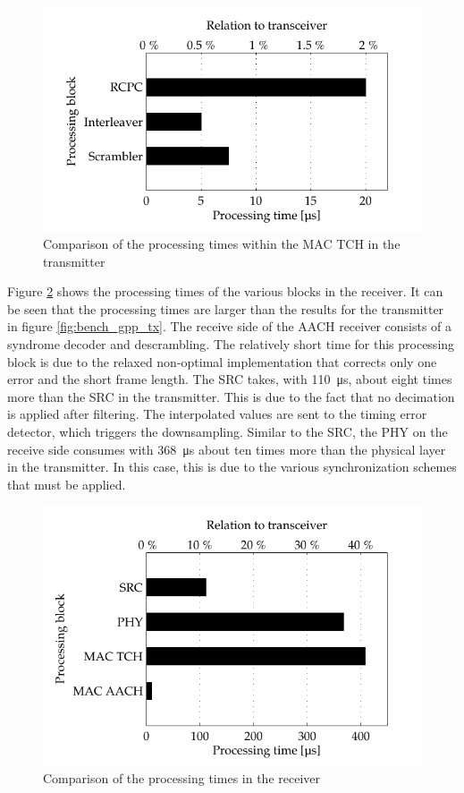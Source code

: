 \begin{figure}[htb]
	\centering
		\includegraphics{../kapitel05/figures/bench_gpp_tx_tch.pdf}
	\caption{Comparison of the processing times within the MAC TCH in the transmitter}
	\label{fig:bench_gpp_tx_tch}
\end{figure}

Figure \ref{fig:bench_gpp_rx} shows the processing times of the various blocks in the receiver. It can be seen that the processing times are larger than the results for the transmitter in figure \ref{fig:bench_gpp_tx}. The receive side of the AACH receiver consists of a syndrome decoder and descrambling. The relatively short time for this processing block is due to the relaxed non-optimal implementation that corrects only one error and the short frame length. The \ac{SRC} takes, with \SI{110}{\micro s}, about eight times more than the \ac{SRC} in the transmitter. This is due to the fact that no decimation is applied after filtering. The interpolated values are sent to the timing error detector, which triggers the downsampling. Similar to the \ac{SRC}, the \ac{PHY} on the receive side consumes with \SI{368}{\micro s} about ten times more than the physical layer in the transmitter. In this case, this is due to the various synchronization schemes that must be applied.

\begin{figure}[h!!]
	\centering
		\includegraphics{../kapitel05/figures/bench_gpp_rx.pdf}
	\caption{Comparison of the processing times in the receiver}
	\label{fig:bench_gpp_rx}
\end{figure}

